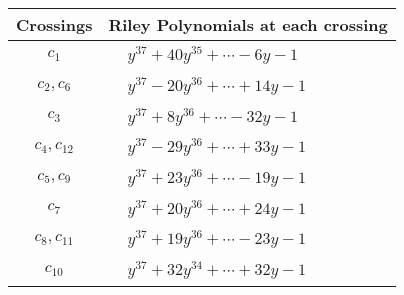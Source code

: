 \documentclass[1p]{elsarticle_modified}
\theoremstyle{definition}
\begin{document}
\begin{tabular}{m{50pt}|m{274pt}}
Crossings & \hspace{64pt}Riley Polynomials at each crossing \\
\hline $$\begin{aligned}c_{1}\end{aligned}$$&$\begin{aligned}
&y^{37}+40 y^{35}+\cdots-6 y-1
\end{aligned}$\\
\hline $$\begin{aligned}c_{2},c_{6}\end{aligned}$$&$\begin{aligned}
&y^{37}-20 y^{36}+\cdots+14 y-1
\end{aligned}$\\
\hline $$\begin{aligned}c_{3}\end{aligned}$$&$\begin{aligned}
&y^{37}+8 y^{36}+\cdots-32 y-1
\end{aligned}$\\
\hline $$\begin{aligned}c_{4},c_{12}\end{aligned}$$&$\begin{aligned}
&y^{37}-29 y^{36}+\cdots+33 y-1
\end{aligned}$\\
\hline $$\begin{aligned}c_{5},c_{9}\end{aligned}$$&$\begin{aligned}
&y^{37}+23 y^{36}+\cdots-19 y-1
\end{aligned}$\\
\hline $$\begin{aligned}c_{7}\end{aligned}$$&$\begin{aligned}
&y^{37}+20 y^{36}+\cdots+24 y-1
\end{aligned}$\\
\hline $$\begin{aligned}c_{8},c_{11}\end{aligned}$$&$\begin{aligned}
&y^{37}+19 y^{36}+\cdots-23 y-1
\end{aligned}$\\
\hline $$\begin{aligned}c_{10}\end{aligned}$$&$\begin{aligned}
&y^{37}+32 y^{34}+\cdots+32 y-1
\end{aligned}$\\
\hline
\end{tabular}\\~\\
\end{document}
